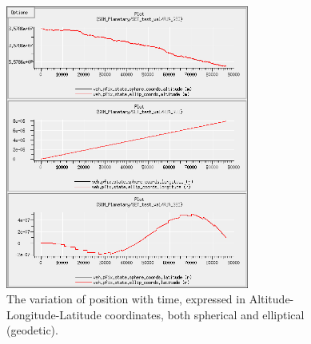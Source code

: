 \begin{description}
\begin{figure}[!ht]
  \begin{center}
        \includegraphics[width=80mm]{figures/planetary_geo_lal.jpg}
        \caption{The variation of position with time, expressed in Altitude-Longitude-Latitude coordinates, both spherical and elliptical (geodetic).} 
        \label{fig:planetarygeolal}
  \end{center}
\end{figure}

\clearpage

\end{description}



